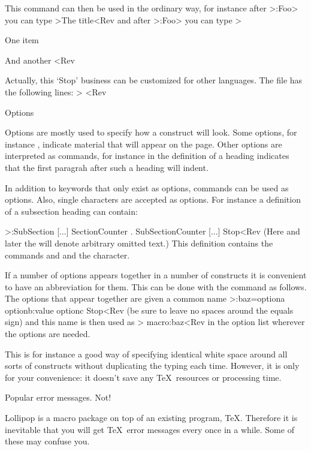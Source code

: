 This command can then be used in the ordinary way, for instance
after \ver>\DefineHeading:Foo> you can type
\Ver>\Foo The title<Rev and after \ver>\DefineList:Foo> you can type
\Ver>\Foo
\item One item
\item And another
\FooStop<Rev

\ImpNote
Actually, this `Stop' business can be customized for other languages.
The file  has the following lines:
\Ver>
\def\stop@command@suffix{Stop}
\def\stop@command{\@command\stop@command@suffix}<Rev
\ImpNoteStop

\Section Options

Options are mostly used to specify how a construct will look. Some
options, for instance , indicate material that will appear
on the page. Other options are interpreted as commands, for instance
 in the definition of a heading indicates that
the first paragrah after such a heading will indent.

In addition to keywords that only exist as options, commands can
be used as options. Also, single characters are accepted as options.
For instance a definition of a subsection heading can contain: 

\Ver>\DefineHeading:SubSection 
    [...]
    SectionCounter . SubSectionCounter
    [...] Stop<Rev
(Here and later the \n{[...]} will denote arbitrary omitted text.)
This definition contains the commands  and
 and the  character.

If a number of options appears together in a number of constructs it
is convenient to have an abbreviation for them. This can be done with the command
 as follows. The options that appear together are
given a common name
 \Ver>\OptionsMacro:baz=optiona optionb:value optionc
    Stop<Rev
(be sure to leave
no spaces around the equals sign) and this name is then used as
 \Ver>    macro:baz<Rev
in the option list wherever the options are needed. 

This is for
instance a good way of specifying identical white space around all
sorts of constructs without duplicating the typing each time.
However, it is only for your convenience: it doesn't save any \TeX\
resources or processing time.

 Popular error messages. Not!

Lollipop is a macro package on top of an existing program, \TeX.
Therefore it is inevitable that you will get \TeX\ error messages
every once in a while. Some of these may confuse you.

